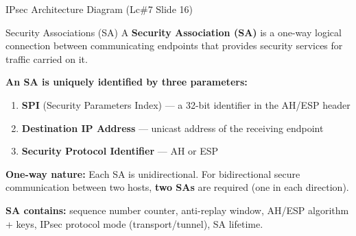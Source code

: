 \documentclass[12pt,a4paper]{article}
\begin{document}
\begin{algobox}{IPsec Architecture Diagram (Lc\#7 Slide 16)}
\begin{center}
\end{center}
\end{algobox}

\vspace{0.5em}

\begin{algobox}{Security Associations (SA)}
A \textbf{Security Association (SA)} is a one-way logical connection between communicating endpoints that provides security services for traffic carried on it.

\medskip
\textbf{An SA is uniquely identified by three parameters:}
\begin{enumerate}[nosep]
  \item \textbf{SPI} (Security Parameters Index) --- a 32-bit identifier in the AH/ESP header
  \item \textbf{Destination IP Address} --- unicast address of the receiving endpoint
  \item \textbf{Security Protocol Identifier} --- AH or ESP
\end{enumerate}

\medskip
\textbf{One-way nature:} Each SA is unidirectional. For bidirectional secure communication between two hosts, \textbf{two SAs} are required (one in each direction).

\medskip
\textbf{SA contains:} sequence number counter, anti-replay window, AH/ESP algorithm + keys, IPsec protocol mode (transport/tunnel), SA lifetime.
\end{algobox}
\end{document}
